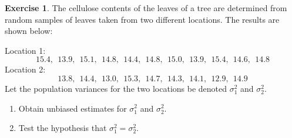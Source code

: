 \documentclass[
]{book}
\theoremstyle{definition}
\theoremstyle{definition}
\theoremstyle{definition}
\newtheorem{exercise}{Exercise}[chapter]
\theoremstyle{definition}
\theoremstyle{remark}
\begin{document}
\begin{exercise}

The cellulose contents of the leaves of a tree are determined from random samples of leaves taken from two different locations. The results are shown below:

Location 1:
\[15.4, \ \ 13.9, \ \ 15.1, \ \ 14.8, \ \ 14.4, \ \ 14.8, \ \ 15.0, \ \  13.9, \ \ 15.4, \ \ 14.6, \ \ 14.8 \]
Location 2:
\[13.8, \ \ 14.4, \ \ 13.0, \ \ 15.3, \ \ 14.7, \ \ 14.3, \ \ 14.1, \ \ 12.9, \ \ 14.9 \]
Let the population variances for the two locations be denoted \(\sigma_1^2\) and \(\sigma_2^2\).

\begin{enumerate}
\def\labelenumi{\alph{enumi})}
\item
  Obtain unbiased estimates for \(\sigma_1^2\) and \(\sigma_2^2\).
\item
  Test the hypothesis that \(\sigma_1^2=\sigma_2^2\).
\end{enumerate}

\end{exercise}

  
\end{document}

